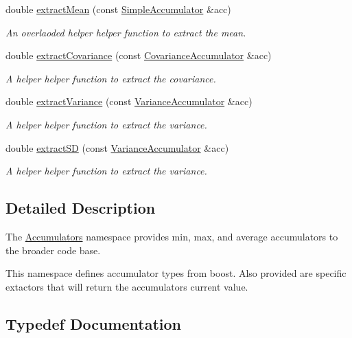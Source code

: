 \begin{DoxyCompactItemize}
double \hyperlink{namespaceAccumulators_ae241aec21f9cee46878d1a589dcba563}{extract\+Mean} (const \hyperlink{namespaceAccumulators_aed31f3acda76edc1d58c2bcb479a7aec}{Simple\+Accumulator} \&acc)
\begin{DoxyCompactList}\small\item\em An overlaoded helper helper function to extract the mean. \end{DoxyCompactList}\item 
double \hyperlink{namespaceAccumulators_a89e5b416840bfe8e056d708b6a236da4}{extract\+Covariance} (const \hyperlink{namespaceAccumulators_a69e0958469bde3d2198062b52880ec68}{Covariance\+Accumulator} \&acc)
\begin{DoxyCompactList}\small\item\em A helper helper function to extract the covariance. \end{DoxyCompactList}\item 
double \hyperlink{namespaceAccumulators_a69a4c9a9e60fc7e6e22b43daa75e48bd}{extract\+Variance} (const \hyperlink{namespaceAccumulators_aa858a2eb0c818655fa5d66012dd41b09}{Variance\+Accumulator} \&acc)
\begin{DoxyCompactList}\small\item\em A helper helper function to extract the variance. \end{DoxyCompactList}\item 
double \hyperlink{namespaceAccumulators_ab0dcf3f9dcccf475b65259308a4507df}{extract\+SD} (const \hyperlink{namespaceAccumulators_aa858a2eb0c818655fa5d66012dd41b09}{Variance\+Accumulator} \&acc)
\begin{DoxyCompactList}\small\item\em A helper helper function to extract the variance. \end{DoxyCompactList}\end{DoxyCompactItemize}


\subsection{Detailed Description}
The \hyperlink{namespaceAccumulators}{Accumulators} namespace provides min, max, and average accumulators to the broader code base. 

This namespace defines accumulator types from boost. Also provided are specific extactors that will return the accumulator\textquotesingle{}s current value. 

\subsection{Typedef Documentation}
